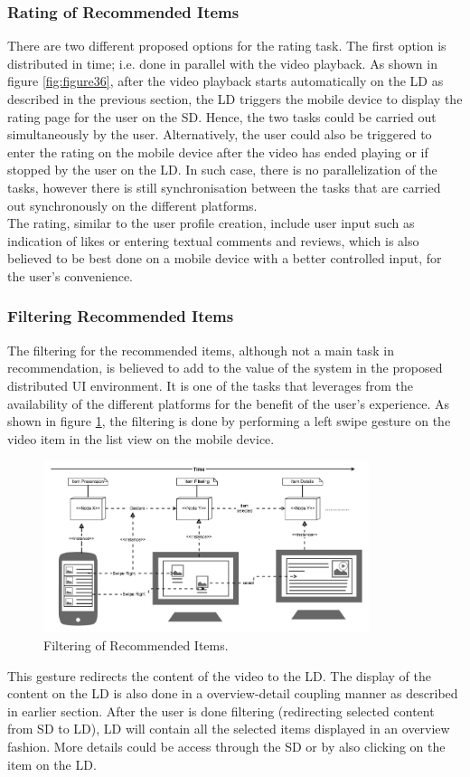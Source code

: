 \subsubsection{Rating of Recommended Items}
There are two different proposed options for the rating task. The first option is distributed in time; i.e. done in parallel with the video playback. As shown in figure \ref{fig:figure36}, after the video playback starts automatically on the LD as described in the previous section, the LD triggers the mobile device to display the rating page for the user on the SD. Hence, the two tasks could be carried out simultaneously by the user.
Alternatively, the user could also be triggered to enter the rating on the mobile device after the video has ended playing or if stopped by the user on the LD. In such case, there is no parallelization of the tasks, however there is still synchronisation between the tasks that are carried out synchronously on the different platforms.\\
The rating, similar to the user profile creation, include user input such as indication of likes or entering textual comments and reviews, which is also believed to be best done on a mobile device with a better controlled input, for the user's convenience.  

\subsubsection{Filtering Recommended Items}
The filtering for the recommended items, although not a main task in recommendation, is believed to add to the value of the system in the proposed distributed UI environment. It is one of the tasks that leverages from the availability of the different platforms for the benefit of the user's experience. As shown in figure \ref{fig:figure39}, the filtering is done by performing a left swipe gesture on the video item in the list view on the mobile device.
\begin{figure}[h!]
\includegraphics[width=0.85\textwidth, inner, center]{filtering}
\caption{Filtering of Recommended Items.}
\label{fig:figure39}
\end{figure}
This gesture redirects the content of the video to the LD. The display of the content on the LD is also done in a overview-detail coupling manner as described in earlier section. After the user is done filtering (redirecting selected content from SD to LD), LD will contain all the selected items displayed in an overview fashion. More details could be access through the SD or by also clicking on the item on the LD.  


